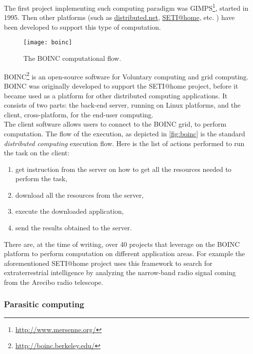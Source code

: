 The first project implementing such computing paradigm was
\ac{GIMPS}\footnote{\url{http://www.mersenne.org/}}, started in 1995. Then other
platforms (such as \href{http://www.distributed.net/}{distributed.net},
\href{http://setiathome.berkeley.edu/}{SETI@home}, etc. ) have been developed to
support this type of computation.

\begin{figure}[htb]
    \centering
    \texttt{[image: boinc]}
    \caption{The \acs{BOINC} computational flow.}
    \label{fig:boinc}
\end{figure}
\acf{BOINC}\footnote{\url{http://boinc.berkeley.edu/}} is an open-source software
for Voluntary computing and grid computing. \ac{BOINC} was originally developed
to support the \acf{SETI@home} project, before it became used as a platform for
other distributed computing applications. It consists of two parts: the back-end
server, running on Linux platforms, and the client, cross-platform, for the
end-user computing.\\

The client software allows users to connect to the \ac{BOINC} grid, to perform
computation. The flow of the execution, as depicted in \autoref{fig:boinc} is
the standard \emph{distributed computing} execution flow.
Here is the list of actions performed to run the task on the client:
\begin{enumerate}
    \item get instruction from the server on how to get all the resources needed
    to perform the task,
    \item download all the resources from the server,
    \item execute the downloaded application,
    \item send the results obtained to the server.
\end{enumerate}

There are, at the time of writing, over 40 projects that leverage on
the \ac{BOINC} platform to perform computation on different application areas.
For example the aforementioned \ac{SETI@home} project uses this framework to
search for extraterrestrial intelligence by analyzing the narrow-band radio
signal coming from the Arecibo radio telescope.


\subsubsection{Parasitic computing}
\label{sec:bg:crowd:auto:parasitic}
